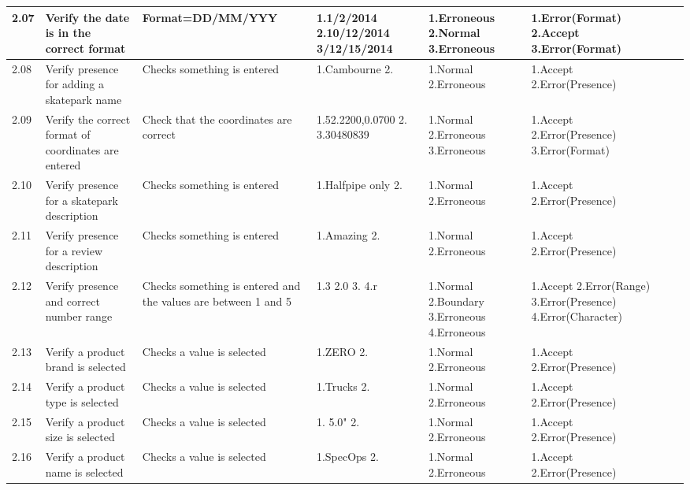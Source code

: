 \begin{landscape}
\begin{center}
\begin{longtable}{|p{1.5cm}|p{2.5cm}|p{2.5cm}|p{2cm}|p{2cm}|p{2cm}|p{2cm}|p{2cm}|}
2.07 & Verify the date is in the correct format & Format=DD/MM/YYY & 1.1/2/2014 2.10/12/2014 3/12/15/2014 & 1.Erroneous 2.Normal 3.Erroneous & 1.Error(Format) 2.Accept 3.Error(Format) & & \\ \hline 

2.08 & Verify presence for adding a skatepark name & Checks something is entered & 1.Cambourne 2.  & 1.Normal 2.Erroneous & 1.Accept 2.Error(Presence) & & \\ \hline 

2.09 & Verify the correct format of coordinates are entered & Check that the coordinates are correct & 1.52.2200,0.0700 2.  3.30480839 & 1.Normal 2.Erroneous 3.Erroneous & 1.Accept 2.Error(Presence) 3.Error(Format) & & \\ \hline

2.10 & Verify presence for a skatepark description & Checks something is entered & 1.Halfpipe only 2.  & 1.Normal 2.Erroneous & 1.Accept 2.Error(Presence) & & \\ \hline

2.11 & Verify presence for a review description & Checks something is entered & 1.Amazing 2. & 1.Normal 2.Erroneous & 1.Accept 2.Error(Presence) & & \\ \hline

2.12 & Verify presence and correct number range & Checks something is entered and the values are between 1 and 5 & 1.3 2.0 3. 4.r & 1.Normal 2.Boundary 3.Erroneous 4.Erroneous & 1.Accept 2.Error(Range) 3.Error(Presence) 4.Error(Character) & & \\ \hline

2.13 & Verify a product brand is selected & Checks a value is selected & 1.ZERO 2. & 1.Normal 2.Erroneous & 1.Accept 2.Error(Presence) & & \\ \hline

2.14 & Verify a product type is selected & Checks a value is selected & 1.Trucks 2. & 1.Normal 2.Erroneous & 1.Accept 2.Error(Presence) & & \\ \hline

2.15 & Verify a product size is selected & Checks a value is selected & 1. 5.0" 2. & 1.Normal 2.Erroneous & 1.Accept 2.Error(Presence) & & \\ \hline

2.16 & Verify a product name is selected & Checks a value is selected & 1.SpecOps 2. & 1.Normal 2.Erroneous & 1.Accept 2.Error(Presence) & & \\ \hline




\end{longtable}
\end{center}
\end{landscape}
